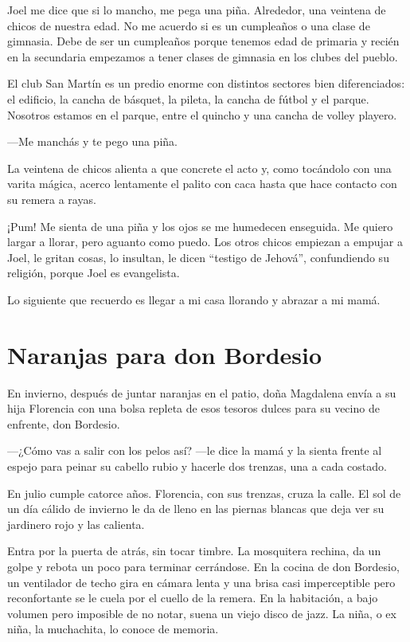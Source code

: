 \documentclass[11pt,twoside,openright]{book}
\begin{document}
Joel me dice que si lo mancho, me pega una piña. Alrededor, una veintena de chicos de nuestra edad. No me acuerdo si es un cumpleaños o una clase de gimnasia. Debe de ser un cumpleaños porque tenemos edad de primaria y recién en la secundaria empezamos a tener clases de gimnasia en los clubes del pueblo.

El club San Martín es un predio enorme con distintos sectores bien diferenciados: el edificio, la cancha de básquet, la pileta, la cancha de fútbol y el parque. Nosotros estamos en el parque, entre el quincho y una cancha de volley playero.

—Me manchás y te pego una piña.

La veintena de chicos alienta a que concrete el acto y, como tocándolo con una varita mágica, acerco lentamente el palito con caca hasta que hace contacto con su remera a rayas.

¡Pum! Me sienta de una piña y los ojos se me humedecen enseguida. Me quiero largar a llorar, pero aguanto como puedo. Los otros chicos empiezan a empujar a Joel, le gritan cosas, lo insultan, le dicen “testigo de Jehová”, confundiendo su religión, porque Joel es evangelista.

Lo siguiente que recuerdo es llegar a mi casa llorando y abrazar a mi mamá.





\chapter*{Naranjas para don Bordesio} 





En invierno, después de juntar naranjas en el patio, doña Magdalena envía a su hija Florencia con una bolsa repleta de esos tesoros dulces para su vecino de enfrente, don Bordesio.

—¿Cómo vas a salir con los pelos así? —le dice la mamá y la sienta frente al espejo para peinar su cabello rubio y hacerle dos trenzas, una a cada costado.

En julio cumple catorce años. Florencia, con sus trenzas, cruza la calle. El sol de un día cálido de invierno le da de lleno en las piernas blancas que deja ver su jardinero rojo y las calienta.

Entra por la puerta de atrás, sin tocar timbre. La mosquitera rechina, da un golpe y rebota un poco para terminar cerrándose. En la cocina de don Bordesio, un ventilador de techo gira en cámara lenta y una brisa casi imperceptible pero reconfortante se le cuela por el cuello de la remera. En la habitación, a bajo volumen pero imposible de no notar, suena un viejo disco de jazz. La niña, o ex niña, la muchachita, lo conoce de memoria.
\end{document}
